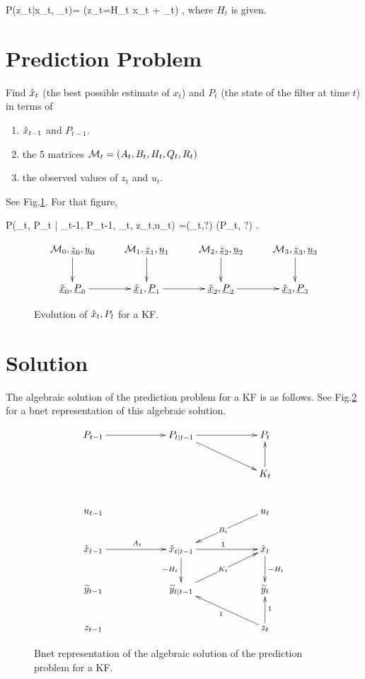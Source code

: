 \beq\color{blue}
P(z_t|x_t, \zeta_t)=
\indi(z_t=H_t x_t +  \zeta_t)
\;,
\eeq
where $H_t$ is given.


\section{Prediction
Problem}
Find ${\hat{x}}_t$ (the 
best possible estimate
of $x_t$)
and $P_t$ (the state of the 
filter at time $t$)
in terms of 
\begin{enumerate}
\item
${\hat{x}}_{t-1}$
and $P_{t-1}$.
\item
 the 5 matrices
${\cal M}_t=(A_t,B_t,H_t,Q_t,R_t)$
\item
the observed  values of 
$z_t$ and $u_t$.

\end{enumerate}
See Fig.\ref{fig-kal-evol}.
For that figure,

\beq \color{blue}
P(\hatx_t, P_t | 
\hatx_{t-1}, P_{t-1},
\calm_t,
z_t,u_t)
=\delta(\hatx_t,?)
\delta(P_t, ?)
\;.
\eeq

\begin{figure}[h!]
\centering
$$\xymatrix{
\calm_0, \rvz_0,\rvu_0\ar[d]&
\calm_1, \rvz_1,\rvu_1\ar[d]&
\calm_2, \rvz_2,\rvu_2\ar[d]&
\calm_3, \rvz_3,\rvu_3\ar[d]
\\
\ul{\hatx}_0, 
\ul{P}_0\ar[r]&
\ul{\hatx}_1, 
\ul{P}_1\ar[r]&
\ul{\hatx}_2, 
\ul{P}_2\ar[r]&
\ul{\hatx}_3, 
\ul{P}_3
}$$
\caption{Evolution of
${\hat{x}}_t, P_t$ for a KF.}
\label{fig-kal-evol}
\end{figure}

\section{
Solution} 

The algebraic solution
of
the prediction problem
for a KF 
is as follows.
See Fig.\ref{fig-kal-evol-plus}
for a bnet representation
of this algebraic
solution.

\begin{figure}[h!]
$$
\xymatrix@C=5pc{
P_{t-1}\ar[r]
&P_{t|t-1}\ar[r]\ar[rd]
&P_t
\\
&&
K_t\ar[u]
\\
u_{t-1}
&
&u_t\ar[ld]|{B_t}
\\
\hatx_{t-1}\ar[r]^{A_t}
&\hatx_{t|t-1}\ar[r]^1
\ar[d]_{-H_t}
&\hatx_t\ar[d]^{-H_t}
\\
\TIL{y}_{t-1}
&\TIL{y}_{t|t-1}\ar[ru]|{K_t}
&\TIL{y}_t
\\
z_{t-1}
&
&z_t\ar[lu]^1
\ar[u]_1
}
$$
\caption{Bnet representation
of the algebraic
solution of
the prediction 
problem for a KF.}
\label{fig-kal-evol-plus}
\end{figure}


